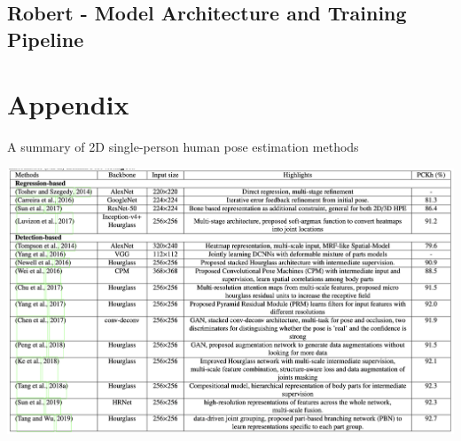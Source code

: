 \documentclass[11pt, letterpaper]{article}
\begin{document}
\subsection{Robert - Model Architecture and Training Pipeline}

\clearpage
\section{Appendix}

\begin{table}[h]
   \centering
   \caption{A summary of 2D single-person human pose estimation methods \cite{Chen_2020}}
   \includegraphics[width=1\textwidth]{summary_2d_1ppl_hpe}
   \label{tab:table_2d_hpe}
\end{table}









\clearpage



\end{document}
